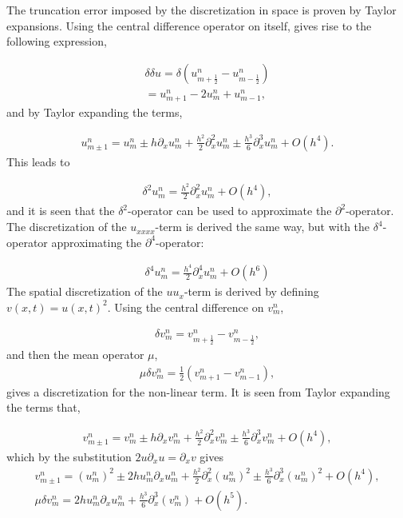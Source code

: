The truncation error imposed by the discretization in space is proven by Taylor expansions. Using the central difference operator on itself, gives rise to the following expression,

\begin{align*}
\delta \delta u = \delta (u_{m+\frac{1}{2}}^n - u_{m-\frac{1}{2}}^ {n}) \\
= u_{m+1}^n -2u_m^n + u_{m-1}^n,
\end{align*}
and by Taylor expanding the terms,

\begin{align*}
u_{m \pm 1}^n = u_m^n \pm h\partial_xu_m^n + \frac{h^2}{2}\partial_x^2u_m^n \pm \frac{h^3}{6}\partial_x^3u_m^n + O(h^4).
\end{align*}
This leads to

\begin{align*}
\delta^2 u_m^n = \frac{h^2}{2}\partial_x^2 u_m^n + O(h^4),
\end{align*}
and it is seen that the $\delta^2$-operator can be used to approximate the $\partial^2$-operator. The discretization of the $u_{xxxx}$-term is derived the same way, but with the $\delta^4$-operator approximating the $\partial^4$-operator:

\begin{align*}
\delta^4 u_m^n = \frac{h^4}{2}\partial_x^4 u_m^n + O(h^6)
\end{align*}
The spatial discretization of the $uu_{x}$-term is derived by defining $v(x,t) = u(x,t)^2$. Using the central difference on $v_{m}^n$,

\begin{align*}
\delta v_m^n = v_{m+\frac{1}{2}}^n - v_{m-\frac{1}{2}}^n,
\end{align*}
and then the mean operator $\mu$,
\begin{align*}
\mu\delta v_m^n = \frac{1}{2}(v_{m+1}^n - v_{m-1}^n),
\end{align*}
gives a discretization for the non-linear term. It is seen from Taylor expanding the terms that,

\begin{align*}
v_{m \pm 1}^n = v_m^n \pm h\partial_xv_m^n + \frac{h^2}{2}\partial_x^2v_m^n \pm \frac{h^3}{6}\partial_x^3v_m^n + O(h^4), 
\end{align*}
which by the substitution $2u\partial_xu = \partial_xv$ gives
\begin{align*}
v_{m \pm 1}^n = (u_m^n)^2 \pm 2hu_m^n\partial_xu_m^n + \frac{h^2}{2}\partial_x^2(u_m^n)^2 \pm \frac{h^3}{6}\partial_x^3(u_m^n)^2 + O(h^4), \\
\mu \delta v_m^n = 2hu_m^n\partial_xu_m^n + \frac{h^3}{6}\partial_{x}^3(v_m^n) + O(h^5).
\end{align*}


